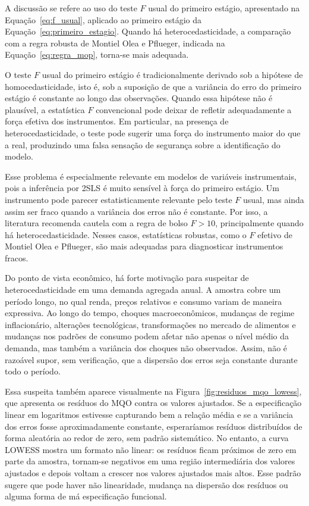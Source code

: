\documentclass[12pt,a4paper]{article}
\begin{document}
\begin{enumerate}[label=\textbf{\arabic*.}]
A discussão se refere ao uso do teste $F$ usual do primeiro estágio, apresentado na Equação~\eqref{eq:f_usual}, aplicado ao primeiro estágio da Equação~\eqref{eq:primeiro_estagio}. Quando há heterocedasticidade, a comparação com a regra robusta de Montiel Olea e Pflueger, indicada na Equação~\eqref{eq:regra_mop}, torna-se mais adequada.

O teste $F$ usual do primeiro estágio é tradicionalmente derivado sob a hipótese de homocedasticidade, isto é, sob a suposição de que a variância do erro do primeiro estágio é constante ao longo das observações. Quando essa hipótese não é plausível, a estatística $F$ convencional pode deixar de refletir adequadamente a força efetiva dos instrumentos. Em particular, na presença de heterocedasticidade, o teste pode sugerir uma força do instrumento maior do que a real, produzindo uma falsa sensação de segurança sobre a identificação do modelo.

Esse problema é especialmente relevante em modelos de variáveis instrumentais, pois a inferência por 2SLS é muito sensível à força do primeiro estágio. Um instrumento pode parecer estatisticamente relevante pelo teste $F$ usual, mas ainda assim ser fraco quando a variância dos erros não é constante. Por isso, a literatura recomenda cautela com a regra de bolso $F>10$, principalmente quando há heterocedasticidade. Nesses casos, estatísticas robustas, como o $F$ efetivo de Montiel Olea e Pflueger, são mais adequadas para diagnosticar instrumentos fracos.

Do ponto de vista econômico, há forte motivação para suspeitar de heterocedasticidade em uma demanda agregada anual. A amostra cobre um período longo, no qual renda, preços relativos e consumo variam de maneira expressiva. Ao longo do tempo, choques macroeconômicos, mudanças de regime inflacionário, alterações tecnológicas, transformações no mercado de alimentos e mudanças nos padrões de consumo podem afetar não apenas o nível médio da demanda, mas também a variância dos choques não observados. Assim, não é razoável supor, sem verificação, que a dispersão dos erros seja constante durante todo o período.

Essa suspeita também aparece visualmente na Figura~\ref{fig:residuos_mqo_lowess}, que apresenta os resíduos do MQO contra os valores ajustados. Se a especificação linear em logaritmos estivesse capturando bem a relação média e se a variância dos erros fosse aproximadamente constante, esperaríamos resíduos distribuídos de forma aleatória ao redor de zero, sem padrão sistemático. No entanto, a curva LOWESS mostra um formato não linear: os resíduos ficam próximos de zero em parte da amostra, tornam-se negativos em uma região intermediária dos valores ajustados e depois voltam a crescer nos valores ajustados mais altos. Esse padrão sugere que pode haver não linearidade, mudança na dispersão dos resíduos ou alguma forma de má especificação funcional.


\end{enumerate}
\end{document}

